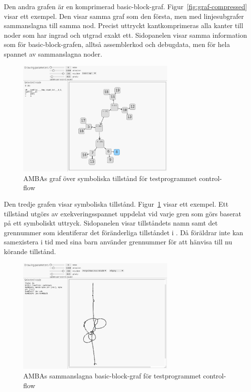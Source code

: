 Den andra grafen är en komprimerad basic-block-graf.
Figur~\ref{fig:graf-compressed} visar ett exempel. Den visar samma graf som den
första, men med linjesubgrafer sammanslagna till samma nod. Precist uttryckt kantkomprimeras
alla kanter till noder som har ingrad och utgrad exakt ett. Sidopanelen visar samma information som för
basic-block-grafen, alltså assemblerkod och debugdata, men för hela spannet av
sammanslagna noder.

\begin{figure}
    \centering
    \includegraphics[width=0.7\textwidth]{figures/graph_symbolic.png}
    \caption{
        AMBAs graf över symboliska tillstånd för testprogrammet control-flow
    }\label{fig:graf-symbolic}
\end{figure}

Den tredje grafen visar symboliska tillstånd. Figur~\ref{fig:graf-symbolic}
visar ett exempel. Ett tillstånd utgörs av exekveringsspannet uppdelat vid varje
gren som görs baserat på ett symboliskt uttryck. Sidopanelen visar
tillståndets namn samt det grennummer som identiferar det föränderliga
tillståndet i \stoe{}. Då föräldrar inte kan samexistera i tid med sina barn
använder \stoe{} grennummer för att hänvisa till nu körande tillstånd.

\begin{figure}
    \centering
    \includegraphics[width=0.7\textwidth]{figures/graph_merged.png}
    \caption{
        AMBAs sammanslagna basic-block-graf för testprogrammet control-flow
    }\label{fig:graf-merged}
\end{figure}

